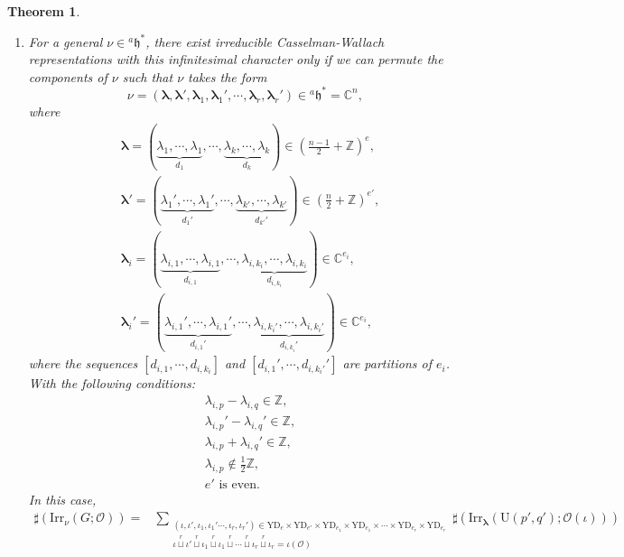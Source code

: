 \documentclass[12pt, a4paper]{amsart}
\numberwithin{equation}{section}
\newtheorem{thm}{Theorem}[section]
\newcommand{\blam}{{\boldsymbol{\lambda}}}
\newcommand{\BC}{{\mathbb {C}}}
\newcommand{\BZ}{{\mathbb {Z}}}
\newcommand{\CO}{{\mathcal {O}}}
\newcommand{\fh}{\mathfrak{h}}
\newcommand{\U}{{\mathrm{U}}}
\newcommand{\Irr}{{\mathrm{Irr}}}
\begin{document}
\begin{thm}
\begin{enumerate}
        \item For a general $\nu \in {^{a}\fh^*}$, there exist irreducible Casselman-Wallach representations with this infinitesimal character only if we can permute the components of $\nu$ such that $\nu$ takes the form
        \begin{equation}
            \nu = (\blam, \blam', \blam_1, \blam_1', \cdots, \blam_r, \blam_r') \in {^{a}\fh}^* = \BC^n,
        \end{equation}
        where 
        \begin{align}
            &\blam = (\underbrace{\lambda_1, \cdots, \lambda_1}_{d_1}, \cdots, \underbrace{\lambda_k, \cdots, \lambda_k}_{d_k}) \in \left(\frac{n-1}{2} + \BZ\right)^{e},\\
            &\blam' = (\underbrace{\lambda_1', \cdots, \lambda_1'}_{d_1'}, \cdots, \underbrace{\lambda_{k'}, \cdots, \lambda_{k'}}_{d_{k'}'}) \in \left(\frac{n}{2} + \BZ\right)^{e'},\\
            &\blam_i = (\underbrace{\lambda_{i,1}, \cdots, \lambda_{i,1}}_{d_{i,1}}, \cdots, \underbrace{\lambda_{i,k_i}, \cdots, \lambda_{i,k_i}}_{d_{i,k_i}}) \in \BC^{e_i},\\
            &\blam_i' = (\underbrace{\lambda_{i,1}', \cdots, \lambda_{i,1}'}_{d_{i,1}'}, \cdots, \underbrace{\lambda_{i,k_i'}, \cdots, \lambda_{i,k_i'}}_{d_{i,k_i}'}) \in \BC^{e_i},
        \end{align}
        where the sequences $[d_{i,1}, \cdots, d_{i,k_i}]$ and $[d_{i,1}', \cdots, d_{i,k_i'}']$ are partitions of $e_i$. With the following conditions: 
        \begin{align*}
            &\lambda_{i,p} - \lambda_{i,q} \in \BZ, \\
            &\lambda_{i,p}' - \lambda_{i,q}' \in \BZ, \\
            &\lambda_{i,p} + \lambda_{i,q}' \in \BZ, \\
            &\lambda_{i,p} \notin \frac{1}{2}\BZ, \\
            &e' \text{ is even.}
        \end{align*}
        In this case, 
        \begin{align*}
            \sharp(\Irr_{\nu}(G;\CO)) = & \sum_{\substack{(\iota, \iota', \iota_1,\iota_1' \cdots,\iota_r, \iota_r') \in \mathrm{YD}_{e} \times \mathrm{YD}_{e'} \times \mathrm{YD}_{e_1} \times \mathrm{YD}_{e_1} \times \cdots \times \mathrm{YD}_{e_r} \times \mathrm{YD}_{e_r} \\ \iota \mathop{\sqcup}\limits^r \iota' \mathop{\sqcup}\limits^r \iota_1 \mathop{\sqcup}\limits^r \iota_1 \mathop{\sqcup}\limits^r \cdots  \mathop{\sqcup}\limits^r \iota_r \mathop{\sqcup}\limits^r \iota_r = \iota(\CO)}} \sharp(\Irr_{\blam}(\U(p',q');\CO(\iota)))\\

\end{align*}
\end{enumerate}
\end{thm}
\end{document}
